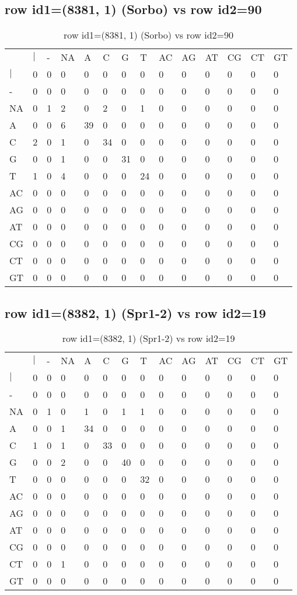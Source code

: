 \subsection{row id1=(8381, 1) (Sorbo) vs row id2=90}
\begin{center}
\begin{longtable}{|l|l|l|l|l|l|l|l|l|l|l|l|l|l|}
\caption{row id1=(8381, 1) (Sorbo) vs row id2=90} \label{table_dm618}\\
\hline
\\
\hline
&$|$&-&NA&A&C&G&T&AC&AG&AT&CG&CT&GT\\
$|$&0&0&0&0&0&0&0&0&0&0&0&0&0\\
-&0&0&0&0&0&0&0&0&0&0&0&0&0\\
NA&0&1&2&0&2&0&1&0&0&0&0&0&0\\
A&0&0&6&39&0&0&0&0&0&0&0&0&0\\
C&2&0&1&0&34&0&0&0&0&0&0&0&0\\
G&0&0&1&0&0&31&0&0&0&0&0&0&0\\
T&1&0&4&0&0&0&24&0&0&0&0&0&0\\
AC&0&0&0&0&0&0&0&0&0&0&0&0&0\\
AG&0&0&0&0&0&0&0&0&0&0&0&0&0\\
AT&0&0&0&0&0&0&0&0&0&0&0&0&0\\
CG&0&0&0&0&0&0&0&0&0&0&0&0&0\\
CT&0&0&0&0&0&0&0&0&0&0&0&0&0\\
GT&0&0&0&0&0&0&0&0&0&0&0&0&0\\
\hline
\end{longtable}
\end{center}

\subsection{row id1=(8382, 1) (Spr1-2) vs row id2=19}
\begin{center}
\begin{longtable}{|l|l|l|l|l|l|l|l|l|l|l|l|l|l|}
\caption{row id1=(8382, 1) (Spr1-2) vs row id2=19} \label{table_dm620}\\
\hline
\\
\hline
&$|$&-&NA&A&C&G&T&AC&AG&AT&CG&CT&GT\\
$|$&0&0&0&0&0&0&0&0&0&0&0&0&0\\
-&0&0&0&0&0&0&0&0&0&0&0&0&0\\
NA&0&1&0&1&0&1&1&0&0&0&0&0&0\\
A&0&0&1&34&0&0&0&0&0&0&0&0&0\\
C&1&0&1&0&33&0&0&0&0&0&0&0&0\\
G&0&0&2&0&0&40&0&0&0&0&0&0&0\\
T&0&0&0&0&0&0&32&0&0&0&0&0&0\\
AC&0&0&0&0&0&0&0&0&0&0&0&0&0\\
AG&0&0&0&0&0&0&0&0&0&0&0&0&0\\
AT&0&0&0&0&0&0&0&0&0&0&0&0&0\\
CG&0&0&0&0&0&0&0&0&0&0&0&0&0\\
CT&0&0&1&0&0&0&0&0&0&0&0&0&0\\
GT&0&0&0&0&0&0&0&0&0&0&0&0&0\\
\hline
\end{longtable}
\end{center}


